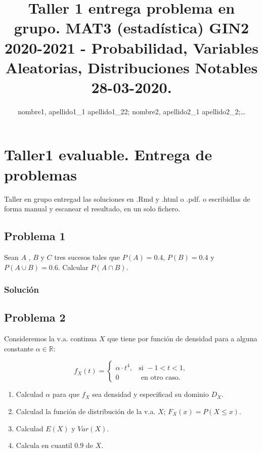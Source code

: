 \documentclass[
]{article}
\title{Taller 1 entrega problema en grupo. MAT3 (estadística) GIN2
2020-2021 - Probabilidad, Variables Aleatorias, Distribuciones Notables
28-03-2020.}
\author{nombre1, apellido1\_1 apellido1\_22; nombre2, apellido2\_1
apellido2\_2;\ldots{}}
\date{}
\providecommand{\tightlist}{%
  \setlength{\itemsep}{0pt}\setlength{\parskip}{0pt}}
\begin{document}
\maketitle

\hypertarget{taller1-evaluable.-entrega-de-problemas}{%
\section{Taller1 evaluable. Entrega de
problemas}\label{taller1-evaluable.-entrega-de-problemas}}

Taller en grupo entregad las soluciones en .Rmd y .html o .pdf. o
escribidlas de forma manual y escanear el resultado, en un solo fichero.

\hypertarget{problema-1}{%
\subsection{Problema 1}\label{problema-1}}

Sean \(A\) , \(B\) y \(C\) tres sucesos tales que \(P(A)=0.4\),
\(P(B)=0.4\) y \(P(A\cup B)=0.6\). Calcular \(P(A\cap B)\).

\hypertarget{soluciuxf3n}{%
\subsubsection{Solución}\label{soluciuxf3n}}

\hypertarget{problema-2}{%
\subsection{Problema 2}\label{problema-2}}

Consideremos la v.a. continua \(X\) que tiene por función de densidad
para a alguna constante \(\alpha\in \mathbb{R}\):

\[
f_X (t)=
\left\{\begin{array}{ll}
\alpha \cdot t^4, & \mbox{si } -1 < t <1,
 \\
0 & \mbox{ en otro caso}.
\end{array}\right.
\]

\begin{enumerate}
\def\labelenumi{\arabic{enumi}.}
\tightlist
\item
  Calculad \(\alpha\) para que \(f_X\) sea densidad y especificad su
  dominio \(D_X\).
\item
  Calculad la función de distribución de la v.a. \(X\);
  \(F_X(x)=P(X\leq x)\).
\item
  Calculad \(E(X)\) y \(Var(X)\).
\item
  Calcula en cuantil \(0.9\) de \(X\).
\end{enumerate}
\end{document}

